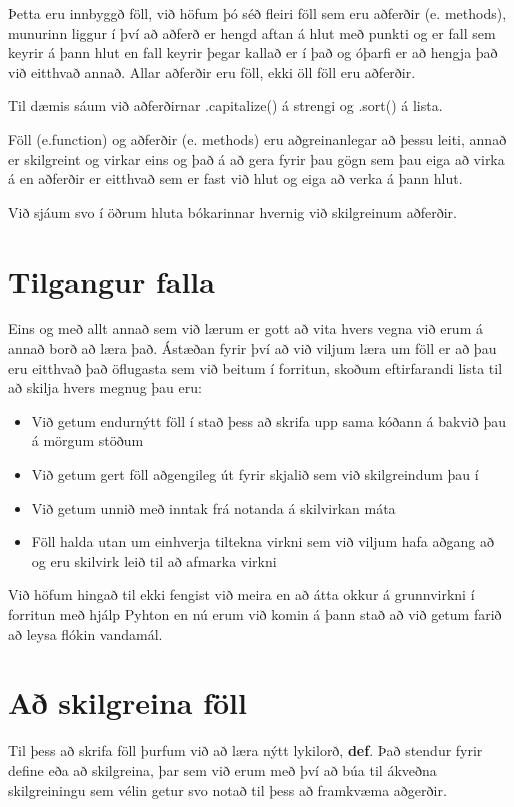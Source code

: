 Þetta eru innbyggð föll, við höfum þó séð fleiri föll sem eru aðferðir (e. methods), munurinn liggur í því að aðferð er hengd aftan á hlut með punkti og er fall sem keyrir á þann hlut en fall keyrir þegar kallað er í það og óþarfi er að hengja það við eitthvað annað.
Allar aðferðir eru föll, ekki öll föll eru aðferðir.

Til dæmis sáum við aðferðirnar .capitalize() á strengi og .sort() á lista.

Föll (e.function) og aðferðir (e. methods) eru aðgreinanlegar að þessu leiti, annað er skilgreint og virkar eins og það á að gera fyrir þau gögn sem þau eiga að virka á en aðferðir er eitthvað sem er fast við hlut og eiga að verka á þann hlut.

Við sjáum svo í öðrum hluta bókarinnar hvernig við skilgreinum aðferðir.

\section{Tilgangur falla}
Eins og með allt annað sem við lærum er gott að vita hvers vegna við erum á annað borð að læra það.
Ástæðan fyrir því að við viljum læra um föll er að þau eru eitthvað það öflugasta sem við beitum í forritun, skoðum eftirfarandi lista til að skilja hvers megnug þau eru:

\begin{itemize}
	\item Við getum endurnýtt föll í stað þess að skrifa upp sama kóðann á bakvið þau á mörgum stöðum
	\item Við getum gert föll aðgengileg út fyrir skjalið sem við skilgreindum þau í
	\item Við getum unnið með inntak frá notanda á skilvirkan máta
	\item Föll halda utan um einhverja tiltekna virkni sem við viljum hafa aðgang að og eru skilvirk leið til að afmarka virkni
\end{itemize}

Við höfum hingað til ekki fengist við meira en að átta okkur á grunnvirkni í forritun með hjálp Pyhton en nú erum við komin á þann stað að við getum farið að leysa flókin vandamál.


\section{Að skilgreina föll}
Til þess að skrifa föll þurfum við að læra nýtt lykilorð, \textbf{def}.
Það stendur fyrir define eða að skilgreina, þar sem við erum með því að búa til ákveðna skilgreiningu sem vélin getur svo notað til þess að framkvæma aðgerðir.

